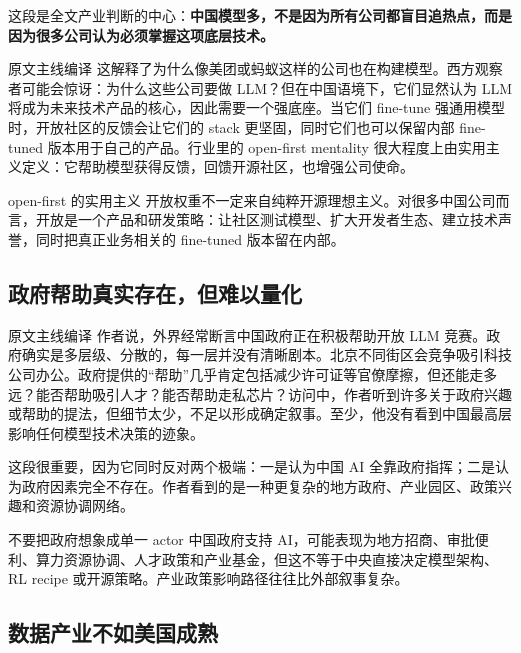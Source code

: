 \documentclass[a4paper]{article}
\begin{document}
这段是全文产业判断的中心：\textbf{中国模型多，不是因为所有公司都盲目追热点，而是因为很多公司认为必须掌握这项底层技术。}

\begin{translationbox}{原文主线编译}
这解释了为什么像美团或蚂蚁这样的公司也在构建模型。西方观察者可能会惊讶：为什么这些公司要做 LLM？但在中国语境下，它们显然认为 LLM 将成为未来技术产品的核心，因此需要一个强底座。当它们 fine-tune 强通用模型时，开放社区的反馈会让它们的 stack 更坚固，同时它们也可以保留内部 fine-tuned 版本用于自己的产品。行业里的 open-first mentality 很大程度上由实用主义定义：它帮助模型获得反馈，回馈开源社区，也增强公司使命。
\end{translationbox}

\begin{importantbox}{open-first 的实用主义}
开放权重不一定来自纯粹开源理想主义。对很多中国公司而言，开放是一个产品和研发策略：让社区测试模型、扩大开发者生态、建立技术声誉，同时把真正业务相关的 fine-tuned 版本留在内部。
\end{importantbox}

\subsection{政府帮助真实存在，但难以量化}

\begin{translationbox}{原文主线编译}
作者说，外界经常断言中国政府正在积极帮助开放 LLM 竞赛。政府确实是多层级、分散的，每一层并没有清晰剧本。北京不同街区会竞争吸引科技公司办公。政府提供的``帮助''几乎肯定包括减少许可证等官僚摩擦，但还能走多远？能否帮助吸引人才？能否帮助走私芯片？访问中，作者听到许多关于政府兴趣或帮助的提法，但细节太少，不足以形成确定叙事。至少，他没有看到中国最高层影响任何模型技术决策的迹象。
\end{translationbox}

这段很重要，因为它同时反对两个极端：一是认为中国 AI 全靠政府指挥；二是认为政府因素完全不存在。作者看到的是一种更复杂的地方政府、产业园区、政策兴趣和资源协调网络。

\begin{warningbox}{不要把政府想象成单一 actor}
中国政府支持 AI，可能表现为地方招商、审批便利、算力资源协调、人才政策和产业基金，但这不等于中央直接决定模型架构、RL recipe 或开源策略。产业政策影响路径往往比外部叙事复杂。
\end{warningbox}

\subsection{数据产业不如美国成熟}
\end{document}
